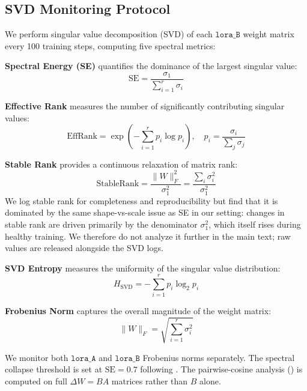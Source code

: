 \documentclass[11pt]{article}
\begin{document}
\begin{table}[t]
\label{tab:experiments}
\end{table}

\subsection{SVD Monitoring Protocol}

We perform singular value decomposition (SVD) of each $\texttt{lora\_B}$ weight matrix every 100 training steps, computing five spectral metrics:

\textbf{Spectral Energy (SE)} quantifies the dominance of the largest singular value:
\begin{equation}
    \text{SE} = \frac{\sigma_1}{\sum_{i=1}^{r} \sigma_i}
    \label{eq:se}
\end{equation}

\textbf{Effective Rank} \cite{roy2007effective} measures the number of significantly contributing singular values:
\begin{equation}
    \text{EffRank} = \exp\left(-\sum_{i=1}^{r} p_i \log p_i\right), \quad p_i = \frac{\sigma_i}{\sum_j \sigma_j}
    \label{eq:effrank}
\end{equation}

\textbf{Stable Rank} provides a continuous relaxation of matrix rank:
\begin{equation}
    \text{StableRank} = \frac{\|W\|_F^2}{\sigma_1^2} = \frac{\sum_i \sigma_i^2}{\sigma_1^2}
    \label{eq:stablerank}
\end{equation}
We log stable rank for completeness and reproducibility but find that it is dominated by the same shape-vs-scale issue as SE in our setting: changes in stable rank are driven primarily by the denominator $\sigma_1^2$, which itself rises during healthy training. We therefore do not analyze it further in the main text; raw values are released alongside the SVD logs.

\textbf{SVD Entropy} measures the uniformity of the singular value distribution:
\begin{equation}
    H_{\text{SVD}} = -\sum_{i=1}^{r} p_i \log_2 p_i
    \label{eq:entropy}
\end{equation}

\textbf{Frobenius Norm} captures the overall magnitude of the weight matrix:
\begin{equation}
    \|W\|_F = \sqrt{\sum_{i=1}^{r} \sigma_i^2}
    \label{eq:frobenius}
\end{equation}

We monitor both $\texttt{lora\_A}$ and $\texttt{lora\_B}$ Frobenius norms separately. The spectral collapse threshold is set at $\text{SE} = 0.7$ following \citet{biderman2024lora}. The pairwise-cosine analysis () is computed on full $\Delta W = BA$ matrices rather than $B$ alone.
\end{document}
